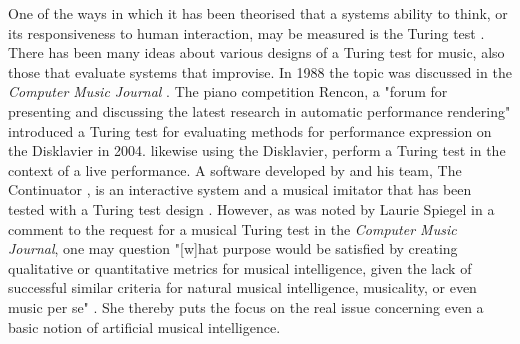 \documentclass[11pt]{article}
\begin{document}
One of the ways in which it has been theorised that a systems ability
to think, or its responsiveness to human interaction, may be measured
is the Turing test \citep{Turing1950}. There has been many ideas about
various designs of a Turing test for music, also those that evaluate
systems that improvise. In 1988 the topic was discussed in the
\emph{Computer Music Journal} \citep[7-9]{spiegel1988}. The piano
competition Rencon, a "forum for presenting and discussing the latest
research in automatic performance rendering" \citep[120]{Hiraga2004}
introduced a Turing test for evaluating methods for performance
expression on the Disklavier in 2004. \citeauthor{Roda2015} likewise
using the Disklavier, perform a Turing test in the context of a live
performance. A software developed by \citet{Pachet2003} and his team,
The Continuator \citep{Pachet2003,Pachet2003b}, is an interactive
system and a musical imitator that has been tested with a Turing test
design \citep{pachet2012}. However, as was noted by Laurie Spiegel in
a comment to the request for a musical Turing test in the
\emph{Computer Music Journal}, one may question "[w]hat purpose would
be satisfied by creating qualitative or quantitative metrics for
musical intelligence, given the lack of successful similar criteria
for natural musical intelligence, musicality, or even music per se"
\citep[9]{spiegel1988}. She thereby puts the focus on the real issue
concerning even a basic notion of artificial musical intelligence.
\end{document}
